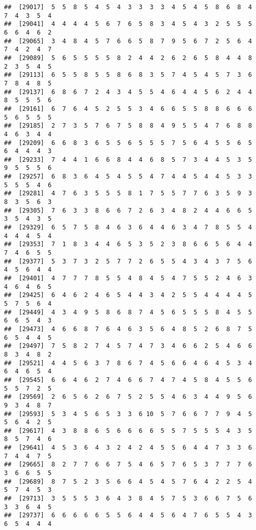 \documentclass[
]{book}
\begin{document}
\begin{verbatim}
##  [29017]  5  5  8  5  4  5  4  3  3  3  3  4  5  4  5  8  6  8  4  7  4  3  5  4
##  [29041]  4  4  4  4  5  6  7  6  5  8  3  4  5  4  3  2  5  5  5  6  6  4  6  2
##  [29065]  3  4  8  4  5  7  6  6  5  8  7  9  5  6  7  2  5  6  4  7  4  2  4  7
##  [29089]  5  6  5  5  5  5  8  2  4  4  2  6  2  6  5  8  4  4  8  2  3  5  4  5
##  [29113]  6  5  5  8  5  5  8  6  8  3  5  7  4  5  4  5  7  3  6  7  8  4  8  5
##  [29137]  6  8  6  7  2  4  3  4  5  5  4  6  4  4  5  6  2  4  4  8  5  5  5  6
##  [29161]  6  7  6  4  5  2  5  5  3  4  6  6  5  5  8  8  6  6  6  5  6  5  5  5
##  [29185]  2  7  3  5  7  6  7  5  8  8  4  9  5  5  4  7  6  8  8  4  6  3  4  4
##  [29209]  6  6  8  3  6  5  5  6  5  5  5  7  5  6  4  5  5  6  5  6  4  4  4  3
##  [29233]  7  4  4  1  6  6  8  4  4  6  8  5  7  3  4  4  5  3  5  9  5  5  5  6
##  [29257]  6  8  3  6  4  5  4  5  5  4  7  4  4  5  4  4  5  3  3  5  5  5  4  6
##  [29281]  4  7  6  3  5  5  5  8  1  7  5  5  7  7  6  3  5  9  3  8  3  5  6  3
##  [29305]  7  6  3  3  8  6  6  7  2  6  3  4  8  2  4  4  6  6  5  3  5  4  3  5
##  [29329]  6  5  7  5  8  4  6  3  6  4  4  6  3  4  7  8  5  5  4  4  4  4  5  4
##  [29353]  7  1  8  3  4  4  6  5  3  5  2  3  8  6  6  5  6  4  4  7  4  6  5  5
##  [29377]  5  3  7  3  2  5  7  7  2  6  5  5  4  3  4  3  7  5  6  4  5  6  4  4
##  [29401]  4  7  7  7  8  5  5  4  8  4  5  4  7  5  5  2  4  6  3  4  6  4  6  5
##  [29425]  6  4  6  2  4  6  5  4  4  3  4  2  5  5  4  4  4  4  5  5  7  5  6  4
##  [29449]  4  3  4  9  5  8  6  8  7  4  5  6  5  5  5  8  4  5  5  6  6  5  4  3
##  [29473]  4  6  6  8  7  6  4  6  3  5  6  4  8  5  2  6  8  7  5  6  5  4  4  5
##  [29497]  7  5  8  2  7  4  5  7  4  7  3  4  6  6  2  5  4  6  6  8  3  4  8  2
##  [29521]  4  4  5  6  3  7  8  6  7  4  5  6  6  4  6  4  5  3  4  6  4  6  5  4
##  [29545]  6  6  4  6  2  7  4  6  6  7  4  7  4  5  8  4  5  5  6  5  5  7  2  5
##  [29569]  2  6  5  6  2  6  7  5  2  5  5  4  6  3  4  4  9  5  6  9  3  4  8  7
##  [29593]  5  3  4  5  6  5  3  3  6 10  5  7  6  6  7  7  9  4  5  5  6  4  2  5
##  [29617]  4  3  8  8  6  5  6  6  6  6  5  5  7  5  5  5  4  3  5  8  5  7  4  6
##  [29641]  4  5  3  6  4  3  2  4  2  4  5  5  6  4  4  7  3  3  6  7  4  4  7  5
##  [29665]  8  2  7  7  6  6  7  5  4  6  5  7  6  5  3  7  7  7  6  3  6  6  5  5
##  [29689]  8  7  5  2  3  5  6  6  4  5  4  5  7  6  4  2  2  5  4  5  7  4  5  3
##  [29713]  3  5  5  5  3  6  4  3  8  4  5  7  5  3  6  6  7  5  6  3  3  6  4  5
##  [29737]  6  6  6  6  6  5  5  6  4  4  5  6  4  7  6  5  5  4  3  6  5  4  4  4

\end{verbatim}
\end{document}
